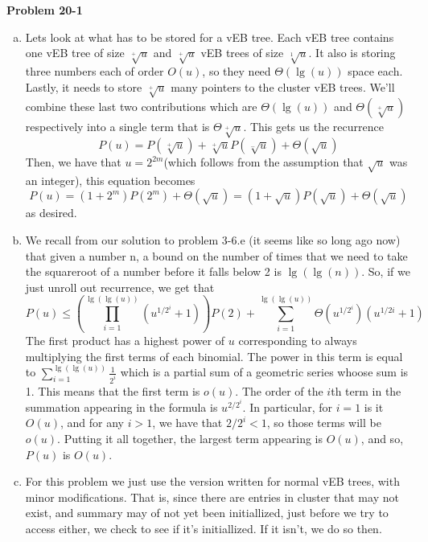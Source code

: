 \documentclass{article}
\begin{document}
\noindent\textbf{Problem 20-1}\\
\begin{enumerate}[a.]
\item
Lets look at what has to be stored for a vEB tree. Each vEB tree contains one vEB tree of size $\sqrt[+]{u}$ and $\sqrt[+]{u}$ vEB trees of size $\sqrt[1]{u}$. It also is storing three numbers each of order $O(u)$, so they need $\Theta(\lg(u))$ space each. Lastly, it needs to store $\sqrt[+]{u}$ many pointers to the cluster vEB trees. We'll combine these last two contributions which are $\Theta(\lg(u))$ and $\Theta(\sqrt[+]{u})$ respectively into a single term that is $\Theta\sqrt[+]{u}$. This gets us the recurrence
\[
P(u) = P(\sqrt[+]{u}) + \sqrt[+]{u}P(\sqrt[-]{u}) + \Theta(\sqrt{u})
\]
Then, we have that $u=2^{2m}$(which follows from the assumption that $\sqrt{u}$ was an integer), this equation becomes
\[
P(u) = (1+2^m)P(2^m) + \Theta(\sqrt{u}) = (1+ \sqrt{u})P(\sqrt{u})+\Theta(\sqrt{u})
\]
as desired.
\item
We recall from our solution to problem 3-6.e (it seems like so long ago now) that given a number n, a bound on the number of times that we need to take the squareroot of a number before it falls below 2 is $\lg(\lg(n))$. So, if we just unroll out recurrence, we get that
\[
P(u) \le \left(\prod_{i=1}^{\lg(\lg(u))}(u^{1/2^i}+1)\right) P(2) + \sum_{i=1}^{\lg(\lg(u))} \Theta(u^{1/2^i})(u^{1/2i}+1)
\]
The first product has a highest power of $u$ corresponding to always multiplying the first terms of each binomial. The power in this term is equal to $\sum_{i=1}^{\lg(\lg(u))} \frac{1}{2^i}$ which is a partial sum of a geometric series whoose sum is 1. This means that the first term is $o(u)$. The order of the $i$th term in the summation appearing in the formula is $u^{2/2^i}$. In particular, for $i=1$ is it $O(u)$, and for any $i>1$, we have that $2/2^i <1$, so those terms will be $o(u)$. Putting it all together, the largest term appearing is $O(u)$, and so, $P(u)$ is $O(u)$.
\item
For this problem we just use the version written for normal vEB trees, with minor modifications. That is, since there are entries in cluster that may not exist, and summary may of not yet been initiallized, just before we try to access either, we check to see if it's initiallized. If it isn't, we do so then.


\end{enumerate}
\end{document}
